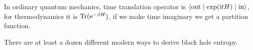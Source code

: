 In ordinary quantum mechanics, time translation operator is
$\langle\mbox{out}\mid\exp(\mathrm{i} tH)\mid\mbox{in}\rangle$, for
thermodynamics it is $\operatorname{Tr}(\mathrm{e}^{-\beta H})$, if we make time imaginary we
get a partition function.

There are at least a dozen different modern ways to derive black hole entropy.

